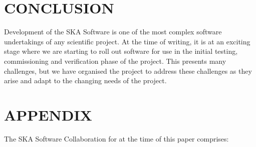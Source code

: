\documentclass[a4paper,
               biblatex,     %
               keeplastbox,   %
               ]{jacow}
\begin{document}




\section{CONCLUSION}
Development of the SKA Software is one of the most complex software undertakings of any scientific project. At the time of writing, it is at an exciting stage where we are  starting to roll out software for use in the initial testing, commissioning and verification phase of the project. This presents many challenges, but we have organised the project to address these challenges as they arise and adapt to the changing needs of the project. 


\section{APPENDIX}
The SKA Software Collaboration for at the time of this paper comprises:
\end{document}
